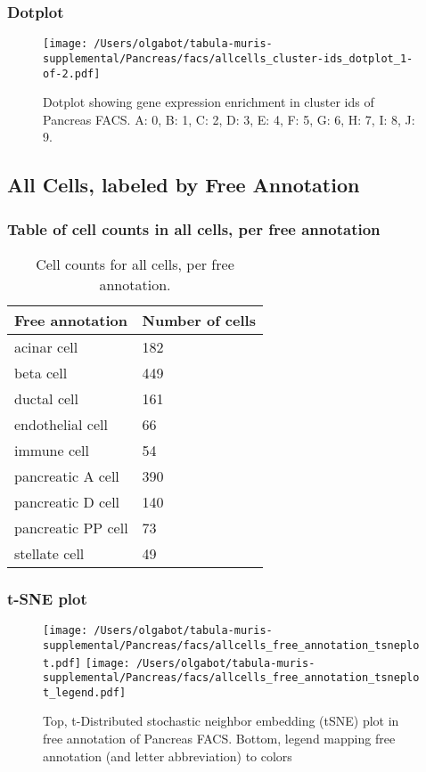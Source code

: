 \newpage
\newpage
\subsubsection{Dotplot}
\begin{figure}[h]
\centering
\texttt{[image: /Users/olgabot/tabula-muris-supplemental/Pancreas/facs/allcells\_cluster-ids\_dotplot\_1-of-2.pdf]}

\caption{ Dotplot  showing gene expression enrichment in cluster ids of Pancreas FACS. A: 0, B: 1, C: 2, D: 3, E: 4, F: 5, G: 6, H: 7, I: 8, J: 9.}
\end{figure}


\newpage
\subsection{All Cells, labeled by Free Annotation}
\subsubsection{Table of cell counts in all cells, per free annotation}\begin{table}[h]
\centering
\label{my-label}
\begin{tabular}{@{}ll@{}}
\toprule

Free annotation& Number of cells \\ \midrule
acinar cell & 182 \\

beta cell & 449 \\

ductal cell & 161 \\

endothelial cell & 66 \\

immune cell & 54 \\

pancreatic A cell & 390 \\

pancreatic D cell & 140 \\

pancreatic PP cell & 73 \\

stellate cell & 49 \\
\bottomrule
\end{tabular}
\caption{Cell counts for all cells, per free annotation.}
\end{table}

\newpage
\subsubsection{t-SNE plot}
\begin{figure}[h]
\centering
\texttt{[image: /Users/olgabot/tabula-muris-supplemental/Pancreas/facs/allcells\_free\_annotation\_tsneplot.pdf]}
\texttt{[image: /Users/olgabot/tabula-muris-supplemental/Pancreas/facs/allcells\_free\_annotation\_tsneplot\_legend.pdf]}
\caption{Top, t-Distributed stochastic neighbor embedding (tSNE) plot  in free annotation of Pancreas FACS. Bottom, legend mapping free annotation (and letter abbreviation) to colors}
\end{figure}


